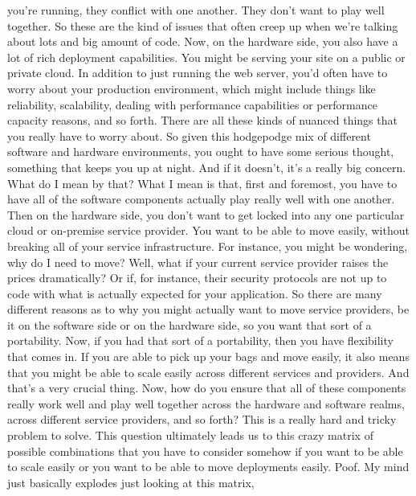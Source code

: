 {{{{{    you're running, they conflict with one another.
    They don't want to play well together.
    So these are the kind of issues that often creep up
    when we're talking about lots and big amount of code.
    Now, on the hardware side, you also have a lot of rich deployment capabilities.
    You might be serving your site on a public or private cloud.
    In addition to just running the web server,
    you'd often have to worry about your production environment, which
    might include things like reliability, scalability,
    dealing with performance capabilities or performance capacity reasons,
    and so forth.
    There are all these kinds of nuanced things
    that you really have to worry about.
    So given this hodgepodge mix of different software and hardware
    environments, you ought to have some serious thought, something
    that keeps you up at night.
    And if it doesn't, it's a really big concern.
    What do I mean by that?
    What I mean is that, first and foremost, you
    have to have all of the software components
    actually play really well with one another.
    Then on the hardware side, you don't want
    to get locked into any one particular cloud or on-premise service provider.
    You want to be able to move easily, without breaking
    all of your service infrastructure.
    For instance, you might be wondering, why do I need to move?
    Well, what if your current service provider
    raises the prices dramatically?
    Or if, for instance, their security protocols
    are not up to code with what is actually expected for your application.
    So there are many different reasons as to why you might actually
    want to move service providers, be it on the software side
    or on the hardware side, so you want that sort of a portability.
    Now, if you had that sort of a portability,
    then you have flexibility that comes in.
    If you are able to pick up your bags and move easily,
    it also means that you might be able to scale easily across different services
    and providers.
    And that's a very crucial thing.
    Now, how do you ensure that all of these components really work well
    and play well together across the hardware and software realms,
    across different service providers, and so forth?
    This is a really hard and tricky problem to solve.
    This question ultimately leads us to this crazy matrix
    of possible combinations that you have to consider somehow
    if you want to be able to scale easily or you want
    to be able to move deployments easily.
    Poof.
    My mind just basically explodes just looking at this matrix,
}}}}}
